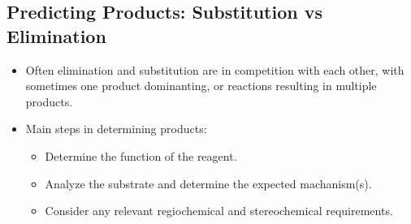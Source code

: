 \documentclass[12pt,a4paper]{article}
\begin{document}
\subsection{Predicting Products: Substitution vs Elimination}
\begin{itemize}
    \item Often elimination and substitution are in competition with each other, with sometimes one product dominanting, or reactions resulting in multiple products.
    \item Main steps in determining products: 
        \begin{itemize}
            \item Determine the function of the reagent.
            \item Analyze the substrate and determine the expected machanism(s).
            \item Consider any relevant regiochemical and stereochemical requirements.
        \end{itemize}

\end{itemize}
\end{document}
